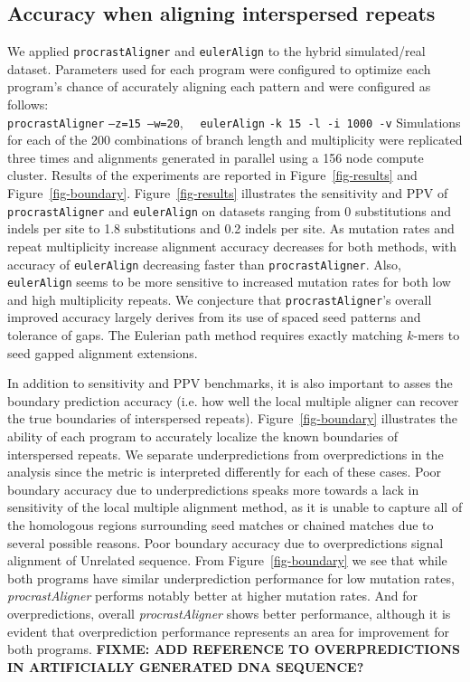 \documentclass{llncs}
\begin{document}
\subsection{Accuracy when aligning interspersed repeats}
We applied \texttt{procrastAligner} and \texttt{eulerAlign} to the
hybrid simulated/real dataset.  Parameters used for each program were
configured to optimize each program's chance of accurately aligning
each pattern and were configured as
follows:\\
\texttt{procrastAligner} \texttt{--z=15 --w=20}, \ \ 
\texttt{eulerAlign} \texttt{-k 15 -l -i 1000 -v}
Simulations for each of the 200 combinations of branch length and
multiplicity were replicated three times and alignments generated in
parallel using a 156 node compute cluster.  Results of the experiments
are reported in Figure~\ref{fig-results} and
Figure~\ref{fig-boundary}. Figure~\ref{fig-results} illustrates the
sensitivity and PPV of \texttt{procrastAligner} and
\texttt{eulerAlign} on datasets ranging from 0 substitutions and
indels per site to 1.8 substitutions and 0.2 indels per site.  As
mutation rates and repeat multiplicity increase alignment accuracy
decreases for both methods, with accuracy of \texttt{eulerAlign}
decreasing faster than \texttt{procrastAligner}.  Also,
\texttt{eulerAlign} seems to be more sensitive to increased mutation
rates for both low and high multiplicity repeats. We conjecture that
\texttt{procrastAligner}'s overall improved accuracy largely derives
from its use of spaced seed patterns\cite{ref-procrast} and tolerance
of gaps. The Eulerian path method requires exactly matching $k$-mers
to seed gapped alignment extensions.

In addition to sensitivity and PPV benchmarks, it is also important to
asses the boundary prediction accuracy (i.e. how well the local
multiple aligner can recover the true boundaries of interspersed
repeats). Figure~\ref{fig-boundary} illustrates the ability of each
program to accurately localize the known boundaries of interspersed
repeats. We separate underpredictions from overpredictions in the
analysis since the metric is interpreted differently for each of these
cases. Poor boundary accuracy due to underpredictions speaks more
towards a lack in sensitivity of the local multiple alignment method,
as it is unable to capture all of the homologous regions surrounding
seed matches or chained matches due to several possible reasons. Poor
boundary accuracy due to overpredictions signal alignment of Unrelated
sequence. From Figure~\ref{fig-boundary} we see that while both
programs have similar underprediction performance for low mutation
rates, \emph{procrastAligner} performs notably better at higher
mutation rates. And for overpredictions, overall
\emph{procrastAligner} shows better performance, although it is
evident that overprediction performance represents an area for
improvement for both programs. \textbf{FIXME: ADD REFERENCE TO
OVERPREDICTIONS IN ARTIFICIALLY GENERATED DNA SEQUENCE?}
\end{document}
